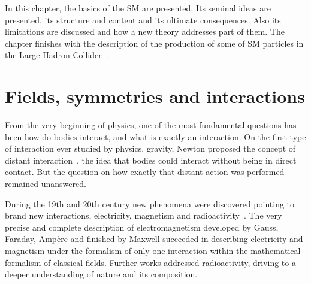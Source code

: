 In this chapter, the basics of the SM are presented. Its seminal ideas are presented, its structure and content and its ultimate consequences. Also its limitations are discussed and how a new theory addresses part of them. The chapter finishes with the description of the production of some of SM particles in the Large Hadron Collider~\cite{1748-0221-3-08-S08001}. 

\section{Fields, symmetries and interactions}
\label{sec:symm}

From the very beginning of physics, one of the most fundamental questions has been how do bodies interact, and what is exactly an interaction. On the first type of interaction ever studied by physics, gravity, Newton proposed the concept of distant interaction~\cite{Newton:2014}, the idea that bodies could interact without being in direct contact. But the question on how exactly that distant action was performed remained unanswered. 

During the 19th and 20th century new phenomena were discovered pointing to brand new interactions, electricity, magnetism and radioactivity~\cite{Pauli:1930pc}. The very precise and complete description of electromagnetism developed by Gauss, Faraday, Amp\`{e}re and finished by Maxwell succeeded in describing electricity and magnetism under the formalism of only one interaction within the mathematical formalism of classical fields. Further works addressed radioactivity, driving to a deeper understanding of nature and its composition.


